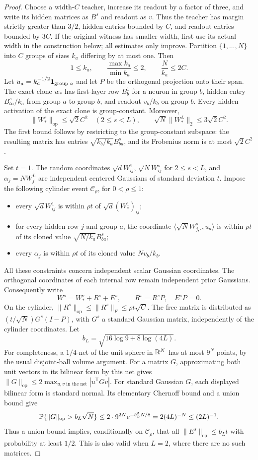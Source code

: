 \begin{proof}
Choose a width-$C$ teacher, increase its readout by a factor of three, and write
its hidden matrices as $B^s$ and readout as $v$. Thus the teacher has margin
strictly greater than $3/2$, hidden entries bounded by $C$, and readout entries
bounded by $3C$. If the original witness has smaller width, first use its actual
width in the construction below; all estimates only improve.
Partition $\{1,\ldots,N\}$ into $C$ groups of sizes $k_a$ differing by at most
one. Then
\[
 1\leq k_a,\qquad \frac{\max k_a}{\min k_a}\leq2,
 \qquad \frac N{k_a}\leq2C.
\]
Let $u_a=k_a^{-1/2}{\bf1}_{\text{group }a}$ and let $P$ be the orthogonal
projection onto their span. The exact clone $w_*$ has first-layer row $B^1_b$
for a neuron in group $b$, hidden entry $B^s_{ba}/k_a$ from group $a$ to group
$b$, and readout $v_b/k_b$ on group $b$. Every hidden activation of the exact
clone is group-constant. Moreover,
\[
 \|W_*^s\|_{\mathrm{op}}\leq\sqrt2 C^2\quad(2\leq s<L),
 \qquad \sqrt N\|W_*^L\|_2\leq3\sqrt2 C^2.
\]
The first bound follows by restricting to the group-constant subspace: the
resulting matrix has entries $\sqrt{k_b/k_a}B^s_{ba}$, and its Frobenius norm
is at most $\sqrt2 C^2$.

Set $t=1$. The random coordinates
$\sqrt d W^1_{ij}$, $\sqrt N W^s_{ij}$ for $2\leq s<L$, and
$\alpha_j=NW^L_j$ are independent centered Gaussians of standard deviation
$t$. Impose the following cylinder event $\mathcal C_\rho$, for
$0<\rho\leq1$:
\begin{itemize}
\item every $\sqrt d W^1_{ij}$ is within $\rho t$ of
$\sqrt d (W_*^1)_{ij}$;
\item for every hidden row $j$ and group $a$, the coordinate
$\langle\sqrt N W^s_{j,\cdot},u_a\rangle$ is within $\rho t$ of its
cloned value $\sqrt{N/k_a}B^s_{ba}$;
\item every $\alpha_j$ is within $\rho t$ of its cloned value $Nv_b/k_b$.
\end{itemize}
All these constraints concern independent scalar Gaussian coordinates.
The orthogonal coordinates of each internal row remain independent prior
Gaussians. Consequently write
\[
 W^s=W_*^s+R^s+E^s,\qquad R^s=R^sP,\quad E^sP=0.
\]
On the cylinder, $\|R^s\|_{\mathrm{op}}\leq\|R^s\|_F\leq\rho t\sqrt C$.
The free matrix is distributed as $(t/\sqrt N)G^s(I-P)$, with $G^s$ a standard
Gaussian matrix, independently of the cylinder coordinates. Let
\[
 b_L=\sqrt{16\log9+8\log(4L)}.
\]
For completeness, a $1/4$-net of the unit sphere in $\mathbb R^N$ has at
most $9^N$ points, by the usual disjoint-ball volume argument. For a matrix
$G$, approximating both unit vectors in its bilinear form by this net gives
$\|G\|_{\mathrm{op}}\leq2\max_{u,v\text{ in the net}}|u^{\mathsf T}Gv|$.
For standard Gaussian $G$, each displayed bilinear form is standard normal.
Its elementary Chernoff bound and a union bound give
\[
 \mathbb P\{\|G\|_{\mathrm{op}}>b_L\sqrt N\}
 \leq2\cdot9^{2N}e^{-b_L^2N/8}
 =2(4L)^{-N}\leq(2L)^{-1}.
\]
Thus a union bound implies, conditionally on
$\mathcal C_\rho$, that all $\|E^s\|_{\mathrm{op}}\leq b_Lt$ with probability
at least $1/2$. This is also valid when $L=2$, where there are no such matrices.


\end{proof}
